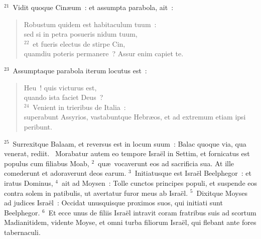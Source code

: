 ${}^{21}$~Vidit quoque Cin\ae um~: et assumpta parabola, ait~: \begin{flushleft}\begin{verse}Robustum quidem est habitaculum tuum~:\\ sed si in petra posueris nidum tuum,\\
${}^{22}$~et fueris electus de stirpe Cin,\\ quamdiu poteris permanere~? Assur enim capiet te.\end{verse}\end{flushleft}


${}^{23}$~Assumptaque parabola iterum locutus est~: \begin{flushleft}\begin{verse}Heu~! quis victurus est,\\ quando ista faciet Deus~?\\
${}^{24}$~Venient in trieribus de Italia~:\\ superabunt Assyrios, vastabuntque Hebr\ae os, et ad extremum etiam ipsi peribunt.\end{verse}\end{flushleft}


${}^{25}$~Surrexitque Balaam, et reversus est in locum suum~: Balac quoque via, qua venerat, rediit.
~\lettrine[lines=10,image=true,loversize=0.05,lraise=-0.03]{M}{}orabatur autem eo tempore Isra\"el in Settim, et fornicatus est populus cum filiabus Moab,
${}^{2}$~qu\ae\ vocaverunt eos ad sacrificia sua. At ille comederunt et adoraverunt deos earum.
${}^{3}$~Initiatusque est Isra\"el Beelphegor~: et iratus Dominus,
${}^{4}$~ait ad Moysen~: Tolle cunctos principes populi, et suspende eos contra solem in patibulis, ut avertatur furor meus ab Isra\"el.
${}^{5}$~Dixitque Moyses ad judices Isra\"el~: Occidat unusquisque proximos suos, qui initiati sunt Beelphegor.
${}^{6}$~Et ecce unus de filiis Isra\"el intravit coram fratribus suis ad scortum Madianitidem, vidente Moyse, et omni turba filiorum Isra\"el, qui flebant ante fores tabernaculi.


